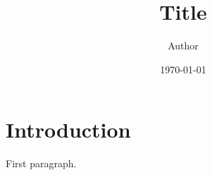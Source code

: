 \documentclass[11pt]{article}
\title{Title}
\author{Author}
\date{\today}
\begin{document}
\maketitle

\section{Introduction}

First paragraph.

\printbibliography
\end{document}
